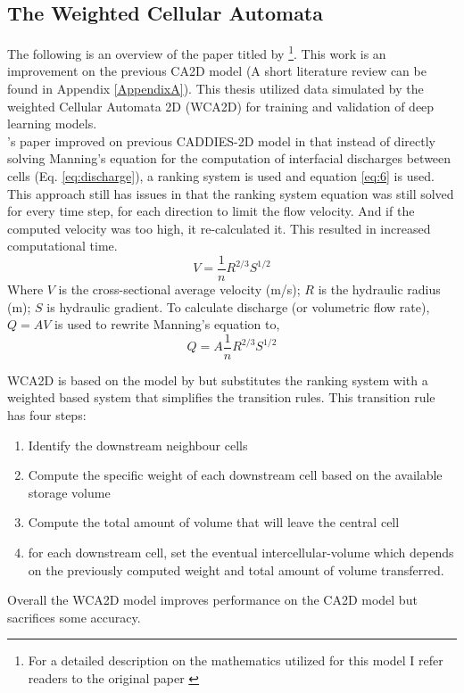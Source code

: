 \subsection*{The Weighted Cellular Automata}
The following is an overview of the paper titled   by \citeauthor{guidolin2016weighted} \footnote{For a detailed description on the mathematics utilized for this model I refer readers to the original paper \cite{guidolin2016weighted}}. This work is an improvement on the previous CA2D model (A short literature review can be found in Appendix \ref{AppendixA}). This thesis utilized data simulated by the weighted Cellular Automata 2D (WCA2D) for training and validation of deep learning models.\\

\citeauthor{Ghimire}'s paper improved on previous CADDIES-2D model in that instead of directly solving Manning's equation for the computation of interfacial discharges between cells (Eq. \ref{eq:discharge}), a ranking system is used and equation \ref{eq:6} is used. This approach still has issues in that the ranking system equation was still solved for every time step, for each direction to limit the flow velocity. And if the computed velocity was too high, it re-calculated it. This resulted in increased computational time.
\begin{equation}
	\label{eq:manning}
	V = \frac{1}{n} {R}^{2/3}S^{1/2}
\end{equation}
Where $V$ is the cross-sectional average velocity (m/s); $R$ is the hydraulic radius (m); $S$ is hydraulic gradient. To calculate discharge (or volumetric flow rate), $Q = AV$ is used to rewrite Manning's equation to,
\begin{equation}
	\label{eq:discharge}
	Q = A \frac{1}{n} {R}^{2/3}S^{1/2}
\end{equation}

WCA2D is based on the model by \citeauthor{Ghimire} but substitutes the ranking system with a weighted based system that simplifies the transition rules. This transition rule has four steps:
\begin{enumerate}
	\item Identify the downstream neighbour cells
	\item Compute the specific weight of each downstream cell based on the available storage volume
	\item Compute the total amount of volume that will leave the central cell
	\item for each downstream cell, set the eventual intercellular-volume which depends on the previously computed weight and total amount of volume transferred.
\end{enumerate}

Overall the WCA2D model improves performance on the CA2D model but sacrifices some accuracy.
